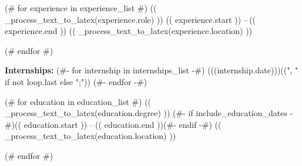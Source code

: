 \documentclass[10pt,a4paper,ragged2e,withhyper]{altacv}
\begin{document}
  \begin{paracol}{2}

    \vspace{-0.35em} %

    (# for experience in experience_list #)
        \cvevent
            {(( _process_text_to_latex(experience.role) ))}
            {}
            {(( experience.start )) --\,(( experience.end ))}
            {(( _process_text_to_latex(experience.location) ))}%
        \hfill\par%
        \bigskip%
    (# endfor #)

    \smallskip\divider%
    \vspace{-0.4em}
    \textbf{Internships:} (#- for internship in internships_list -#)  (((internship.date)))((", " if not loop.last else ";")) (#- endfor -#)
    \bigskip

    \vspace{-0.3em} %
    (# for education in education_list #)
        \cvevent
            {(( _process_text_to_latex(education.degree) ))}
            {}
            {(#- if include_education_dates -#)(( education.start )) --\,(( education.end ))(#- endif -#)}
            {(( _process_text_to_latex(education.location) ))}%
        \hfill\par%
        \bigskip%
    (# endfor #)

    \smallskip\divider%
    \vspace{-0.6em} %
%



\end{paracol}
\end{document}
